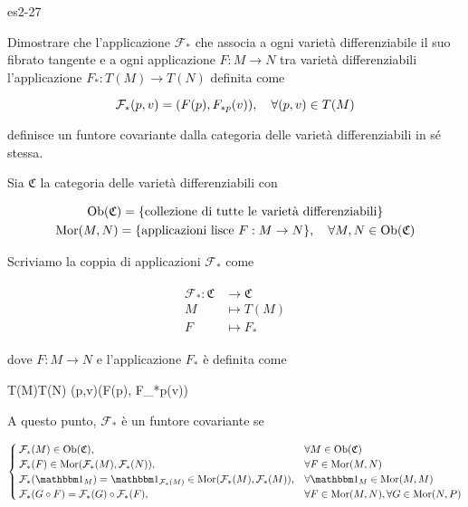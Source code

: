 {es2-27}
{
Dimostrare che l'applicazione $ \mathcal{F}_{*} $ che associa a ogni varietà differenziabile il suo fibrato tangente e a ogni applicazione $ F : M \to N $ tra varietà differenziabili l'applicazione $ F_{*} : T(M) \to T(N) $ definita come

\begin{equation}
	\mathcal{F}_{*}(p,v) = (F(p), F_{*p}(v)) \qcomma \forall (p,v) \in T(M)
\end{equation}

definisce un funtore covariante dalla categoria delle varietà differenziabili in sé stessa.
}
{
Sia $ \mathfrak{C} $ la categoria delle varietà differenziabili con

\begin{gather}
	\ob(\mathfrak{C}) = \{ \text{collezione di tutte le varietà differenziabili} \} \\
	\mor(M,N) = \{ \text{applicazioni lisce } F : M \to N \} \qcomma \forall M,N \in \ob(\mathfrak{C})
\end{gather}

Scriviamo la coppia di applicazioni $ \mathcal{F}_{*} $ come

\begin{align}
	\begin{split}
		\mathcal{F}_{*} : \mathfrak{C} &\to \mathfrak{C} \\
		M &\mapsto T(M) \\
		F &\mapsto F_{*}
	\end{split}
\end{align}

dove $ F : M \to N $ e l'applicazione $ F_{*} $ è definita come

	{T(M)}{T(N)}
	{(p,v)}{(F(p), F_{*p}(v))}

A questo punto, $ \mathcal{F}_{*} $ è un funtore covariante se

\begin{equation}
	\begin{cases}
		\mathcal{F}_{*}(M) \in \ob(\mathfrak{C}), & \forall M \in \ob(\mathfrak{C}) \\
		\mathcal{F}_{*}(F) \in \mor(\mathcal{F}_{*}(M),\mathcal{F}_{*}(N)), & \forall F \in \mor(M,N) \\
		\mathcal{F}_{*}(\bigone_{M}) = \bigone_{\mathcal{F}_{*}(M)} \in \mor(\mathcal{F}_{*}(M),\mathcal{F}_{*}(M)), & \forall \bigone_{M} \in \mor(M,M) \\
		\mathcal{F}_{*}(G \circ F) = \mathcal{F}_{*}(G) \circ \mathcal{F}_{*}(F), & \forall F \in \mor(M,N), \forall G \in \mor(N,P)
	\end{cases}
\end{equation}

}

